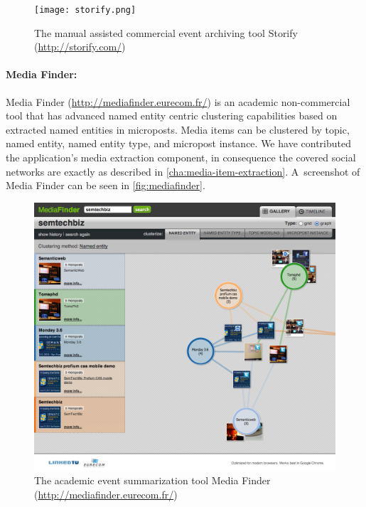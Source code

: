 \begin{figure}
  \centering
  \texttt{[image: storify.png]}
  \caption[The manual assisted commercial event archiving tool Storify]{The manual assisted commercial event archiving tool Storify
    (\url{http://storify.com/})}
  \label{fig:storify}
\end{figure}

\paragraph{Media Finder:}

Media Finder (\url{http://mediafinder.eurecom.fr/})
is an academic non-commercial tool that
has advanced named entity centric clustering capabilities
based on extracted named entities in microposts.
Media items can be clustered by topic, named entity,
named entity type, and micropost instance.
We have contributed the application's media extraction component,
in consequence the covered social networks
are exactly as described in \autoref{cha:media-item-extraction}.
A~screenshot of Media Finder can be seen in \autoref{fig:mediafinder}.

\begin{figure}
  \centering
  \includegraphics[width=\linewidth]{mediafinder.png}
  \caption[The academic event summarization tool Media Finder]{The academic event summarization tool Media Finder (\url{http://mediafinder.eurecom.fr/})}
  \label{fig:mediafinder}
\end{figure}

